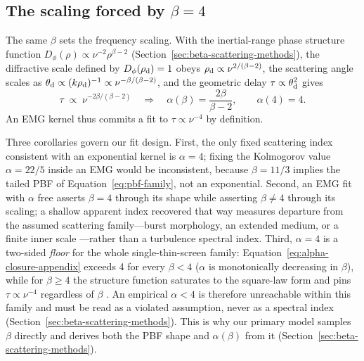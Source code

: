 \subsection{The scaling forced by $\beta=4$}

The same $\beta$ sets the frequency scaling. With the inertial-range phase
structure function $D_\phi(\rho)\propto\nu^{-2}\rho^{\beta-2}$
(Section~\ref{sec:beta-scattering-methods}), the diffractive scale defined by
$D_\phi(\rho_{\rm d})=1$ obeys $\rho_{\rm d}\propto\nu^{2/(\beta-2)}$, the
scattering angle scales as $\theta_{\rm d}\propto(k\rho_{\rm d})^{-1}\propto
\nu^{-\beta/(\beta-2)}$, and the geometric delay $\tau\propto\theta_{\rm d}^{2}$
gives
\begin{equation}
\label{eq:alpha-closure-appendix}
\tau\;\propto\;\nu^{-2\beta/(\beta-2)}
\quad\Longrightarrow\quad
\alpha(\beta)=\frac{2\beta}{\beta-2},
\qquad \alpha(4)=4 .
\end{equation}
An EMG kernel thus commits a fit to $\tau\propto\nu^{-4}$ by definition.

Three corollaries govern our fit design. First, the only fixed scattering index
consistent with an exponential kernel is $\alpha=4$; fixing the Kolmogorov
value $\alpha=22/5$ inside an EMG would be inconsistent, because $\beta=11/3$
implies the tailed PBF of Equation~\ref{eq:pbf-family}, not an exponential.
Second, an EMG fit with $\alpha$ free asserts $\beta=4$ through its shape while
asserting $\beta\neq4$ through its scaling; a shallow apparent index recovered
that way measures departure from the assumed scattering family---burst
morphology, an extended medium, or a finite inner scale
\citep{Bhat2004,Cordes2025}---rather than a turbulence spectral index. Third,
$\alpha=4$ is a two-sided \emph{floor} for the whole single-thin-screen family:
Equation~\ref{eq:alpha-closure-appendix} exceeds 4 for every $\beta<4$
($\alpha$ is monotonically decreasing in $\beta$), while for $\beta\ge4$ the
structure function saturates to the square-law form and pins
$\tau\propto\nu^{-4}$ regardless of $\beta$ \citep{Rickett1990}. An empirical
$\alpha<4$ is therefore unreachable within this family and must be read as a
violated assumption, never as a spectral index
(Section~\ref{sec:beta-scattering-methods}). This is
why our primary model samples $\beta$ directly and derives both the PBF shape
and $\alpha(\beta)$ from it (Section~\ref{sec:beta-scattering-methods}).

